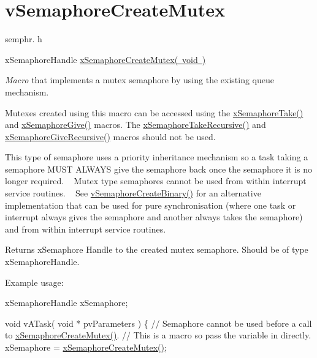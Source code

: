 \hypertarget{group__v_semaphore_create_mutex}{}\section{v\+Semaphore\+Create\+Mutex}
\label{group__v_semaphore_create_mutex}
semphr. h 
\begin{DoxyPre}xSemaphoreHandle \mbox{\hyperlink{semphr_8h_aa6a00aa9b91a9e5b3ebe4ae1c3f115c6}{xSemaphoreCreateMutex( void )}}\end{DoxyPre}


{\itshape Macro} that implements a mutex semaphore by using the existing queue mechanism.

Mutexes created using this macro can be accessed using the \mbox{\hyperlink{semphr_8h_af116e436d2a5ae5bd72dbade2b5ea930}{x\+Semaphore\+Take()}} and \mbox{\hyperlink{semphr_8h_aae55761cabfa9bf85c8f4430f78c0953}{x\+Semaphore\+Give()}} macros. The \mbox{\hyperlink{semphr_8h_ad395f4bba51eea6af3397d72bc079e4d}{x\+Semaphore\+Take\+Recursive()}} and \mbox{\hyperlink{semphr_8h_a398d66b17856c22dd49d39aaac42f105}{x\+Semaphore\+Give\+Recursive()}} macros should not be used.

This type of semaphore uses a priority inheritance mechanism so a task \textquotesingle{}taking\textquotesingle{} a semaphore M\+U\+ST A\+L\+W\+A\+YS \textquotesingle{}give\textquotesingle{} the semaphore back once the semaphore it is no longer required. ~\newline
 Mutex type semaphores cannot be used from within interrupt service routines. ~\newline
 See \mbox{\hyperlink{semphr_8h_ae10bffadd26fbd5bcce76bf33a83ef30}{v\+Semaphore\+Create\+Binary()}} for an alternative implementation that can be used for pure synchronisation (where one task or interrupt always \textquotesingle{}gives\textquotesingle{} the semaphore and another always \textquotesingle{}takes\textquotesingle{} the semaphore) and from within interrupt service routines.

\begin{DoxyReturn}{Returns}
x\+Semaphore Handle to the created mutex semaphore. Should be of type x\+Semaphore\+Handle.
\end{DoxyReturn}
Example usage\+: 
\begin{DoxyPre}
xSemaphoreHandle xSemaphore;\end{DoxyPre}



\begin{DoxyPre}void vATask( void * pvParameters )
\{
   // Semaphore cannot be used before a call to \mbox{\hyperlink{semphr_8h_aa6a00aa9b91a9e5b3ebe4ae1c3f115c6}{xSemaphoreCreateMutex()}}.
   // This is a macro so pass the variable in directly.
   xSemaphore = \mbox{\hyperlink{semphr_8h_aa6a00aa9b91a9e5b3ebe4ae1c3f115c6}{xSemaphoreCreateMutex()}};\end{DoxyPre}



